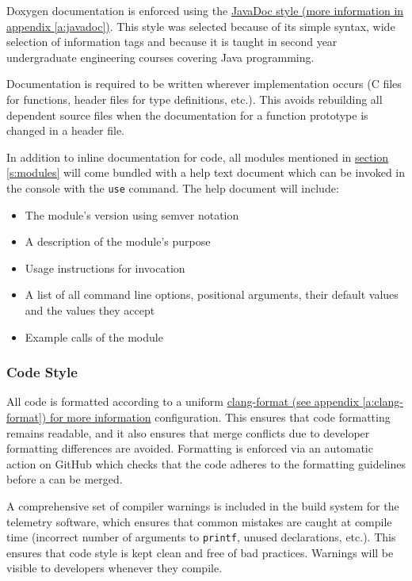 Doxygen documentation is enforced using the \hyperref[a:javadoc]{JavaDoc style (more information in appendix
    \ref{a:javadoc})}. This style was selected because of its simple syntax, wide selection of information tags and because
it is taught in second year undergraduate engineering courses covering Java programming.

Documentation is required to be written wherever implementation occurs (C files for functions, header files for type
definitions, etc.). This avoids rebuilding all dependent source files when the documentation for a function prototype
is changed in a header file. \cite{doxygen-headers}

In addition to inline documentation for code, all modules mentioned in \hyperref[s:modules]{section \ref{s:modules}}
will come bundled with a help text document which can be invoked in the console with the \texttt{use} command. The help
document will include:

\begin{itemize}
    \setlength{\itemsep}{1pt}
    \setlength{\parskip}{0pt} \setlength{\parsep}{0pt}
    \item The module's version using \gls{semver} notation
    \item A description of the module's purpose
    \item Usage instructions for invocation
    \item A list of all command line options, positional arguments, their default values and the values they accept
    \item Example calls of the module
\end{itemize}

\subsubsection{Code Style}

All code is formatted according to a uniform \hyperref[a:clang-format]{clang-format (see appendix \ref{a:clang-format})
    for more information} configuration. This ensures that code formatting remains readable, and it also ensures that merge
conflicts due to developer formatting differences are avoided. Formatting is enforced via an automatic action on GitHub
which checks that the code adheres to the formatting guidelines before a  can be merged.

A comprehensive set of compiler warnings is included in the build system for the telemetry software, which ensures that
common mistakes are caught at compile time (incorrect number of arguments to \texttt{printf}, unused declarations,
etc.). This ensures that code style is kept clean and free of bad practices. Warnings will be visible to developers
whenever they compile.

